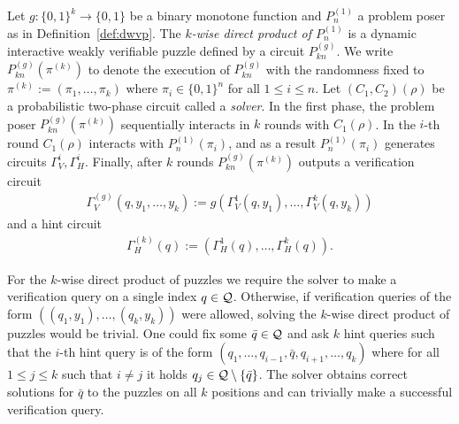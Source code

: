 \begin{definition}
  \label{def:k_wise_direct_product}
  Let $g: \{0,1\}^{k}\!\rightarrow\!\{0,1\}$ be a binary monotone function and $P_n^{(1)}$ a problem poser as in Definition~\ref{def:dwvp}.
  The \textit{$k$-wise direct product of $P_n^{(1)}$} is a dynamic interactive weakly verifiable puzzle defined by a circuit $P_{kn}^{(g)}$.
  We write $P_{kn}^{(g)}(\pi^{(k)})$ to denote the execution of $P_{kn}^{(g)}$ with the randomness fixed to $\pi^{(k)} := (\pi_1, \dots, \pi_k)$
  where $\pi_i \in \{0,1\}^n$ for all $1 \leq i \leq n$. Let $(C_1, C_2)(\rho)$ be a probabilistic two-phase circuit called a \textit{solver}.
  In the first phase, the problem poser $P_{kn}^{(g)}(\pi^{(k)})$ sequentially interacts in $k$ rounds with $C_1(\rho)$.
  In the $i$-th round $C_1(\rho)$ interacts with $P_n^{(1)}(\pi_i)$, and as a result $P_{n}^{(1)}(\pi_i)$ generates circuits $\Gamma_V^i, \Gamma_H^i$.
  Finally, after $k$ rounds $P_{kn}^{(g)}(\pi^{(k)})$ outputs a verification circuit
\begin{align*}
  \Gamma_V^{(g)} (q, y_1, \dots, y_k) := g(\Gamma_V^{1}(q, y_1), \dotsc, \Gamma_V^{k}(q, y_k))
\end{align*}
and a hint circuit
\begin{align*}
  \Gamma_H^{(k)} (q) := (\Gamma_H^{1}(q), \dotsc, \Gamma_H^{k}(q)).
\end{align*}
\end{definition}

For the $k$-wise direct product of puzzles we require the solver to make a verification query on a single index $q \in \mathcal{Q}$.
Otherwise, if verification queries of the form $((q_1,y_1), \dotsc, (q_k, y_k))$ were allowed,
solving the $k$-wise direct product of puzzles would be trivial.
One could fix some $\bar{q} \in \mathcal{Q}$ and ask
$k$ hint queries such that the $i$-th hint query is of the form $(q_1, \dotsc,q_{i-1}, \bar{q}, q_{i+1}, \dotsc, q_k)$ where
for all $1 \leq j \leq k$ such that $i \neq j$ it holds $q_j \in \mathcal{Q} \setminus \{\bar{q}\}$.
The solver obtains correct solutions for $\bar{q}$ to the puzzles on all $k$ positions and
can trivially make a successful verification query.

